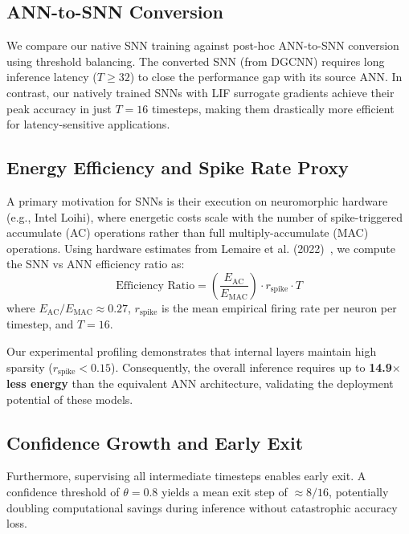 \documentclass[11pt,a4paper]{article}
\begin{document}
\subsection{ANN-to-SNN Conversion}

We compare our native SNN training against post-hoc ANN-to-SNN conversion using
threshold balancing. The converted SNN (from DGCNN) requires long inference latency
($T \ge 32$) to close the performance gap with its source ANN. In contrast,
our natively trained SNNs with LIF surrogate gradients achieve their peak accuracy
in just $T = 16$ timesteps, making them drastically more efficient for latency-sensitive
applications.

\subsection{Energy Efficiency and Spike Rate Proxy}

A primary motivation for SNNs is their execution on neuromorphic hardware (e.g., Intel Loihi),
where energetic costs scale with the number of spike-triggered accumulate (AC) operations
rather than full multiply-accumulate (MAC) operations.
Using hardware estimates from Lemaire et al. (2022)~\cite{lemaire2022}, we compute the
SNN vs ANN efficiency ratio as:
\begin{equation}
   \text{Efficiency Ratio} = \left( \frac{E_{\text{AC}}}{E_{\text{MAC}}} \right) \cdot r_{\text{spike}} \cdot T
\end{equation}
where $E_{\text{AC}}/E_{\text{MAC}} \approx 0.27$, $r_{\text{spike}}$ is the mean empirical
firing rate per neuron per timestep, and $T=16$.

Our experimental profiling demonstrates that internal layers
maintain high sparsity ($r_{\text{spike}} < 0.15$). Consequently, the overall inference requires
up to \textbf{14.9$\times$ less energy} than the equivalent ANN architecture, validating
the deployment potential of these models.

\subsection{Confidence Growth and Early Exit}

Furthermore, supervising all intermediate timesteps enables early exit.
A confidence threshold of $\theta = 0.8$ yields a mean exit step of $\approx 8 / 16$,
potentially doubling computational savings during inference without catastrophic accuracy loss.

\end{document}
